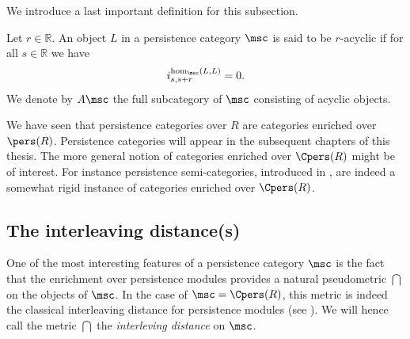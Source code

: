 We introduce a last important definition for this subsection.
\begin{dfn}\label{racyclic}
    Let $r\in\mathbb{R}$. An object $L$ in a persistence category $\msc$ is said to be $r$-acyclic if for all $s\in \mathbb{R}$ we have $$i_{s,s+r}^{\hom_\msc(L,L)}=0.$$
    We denote by $A\msc$ the full subcategory of $\msc$ consisting of acyclic objects.
\end{dfn}
\begin{remark}
    We have seen that persistence categories over $R$ are categories enriched over $\pers(R)$. Persistence categories will appear in the subsequent chapters of this thesis. The more general notion of categories enriched over $\Cpers(R)$ might be of interest. For instance persistence semi-categories, introduced in \cite{Miller:idempotents}, are indeed a somewhat rigid instance of categories enriched over $\Cpers(R)$.
\end{remark}


\subsection{The interleaving distance(s)}\label{sec:dint}
One of the most interesting features of a persistence category $\msc$ is the fact that the enrichment over persistence modules provides a natural pseudometric $\dint$ on the objects of $\msc$. In the case of $\msc=\Cpers(R)$, this metric is indeed the classical interleaving distance for persistence modules (see \cite{PRSZ:top-pers}). We will hence call the metric $\dint$ the \textit{interleving distance} on $\msc$.\\

